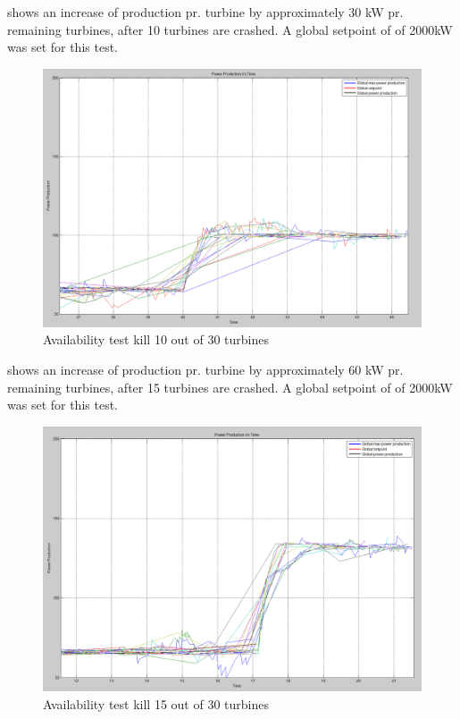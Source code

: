  shows an increase of production pr. turbine by approximately 30 kW pr. remaining turbines, after 10 turbines are crashed. A global setpoint of of 2000kW was set for this test.

\begin{figure}[!h]
	\centering
	\includegraphics[width=\resultsFigureWidthScale\textwidth]{figures/Results/availabilitytest30-20_setpoint_2000.PNG}
	\caption{Availability test kill 10 out of 30 turbines}
	\label{fig:exp:availability_kill10}
\end{figure}

 shows an increase of production pr. turbine by approximately 60 kW pr. remaining turbines, after 15 turbines are crashed. A global setpoint of of 2000kW was set for this test.

\begin{figure}[!h]
	\centering
	\includegraphics[width=\resultsFigureWidthScale\textwidth]{figures/Results/availabilitytest30-15_setpoint_2000.PNG}
	\caption{Availability test kill 15 out of 30 turbines}
	\label{fig:exp:availability_kill15}
\end{figure}

